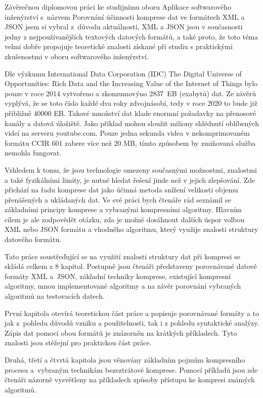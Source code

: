 Závěrečnou diplomovou práci ke studijnímu oboru Aplikace softwarového inženýrství s~ná\-zvem Porovnání účinnosti komprese dat ve formátech XML a JSON jsem si vybral z~důvodu aktuálnosti, XML a JSON jsou v současnosti jedny z nejpoužívanějších textových datových formátů, a také proto, že toto téma velmi dobře propojuje teoretické znalosti získané při studiu s praktickými zkušenostmi v oboru softwarového inženýrství.

Dle výzkumu International Data Corporation (IDC) The Digital Universe of Opportunities: Rich Data and the Increasing Value of the Internet of Things \cite{idc} bylo pouze v roce 2014 vytvořeno a zkonzumovýno 2837~EB (exabytů) dat. Ze závěrů vyplývá, že se toto číslo každé dva roky zdvojnásobí, tedy v roce 2020 to bude již přibližně 40000 EB. Takové množství dat klade enormní požadavky na přenosové kanály a datová úložiště. Jako příklad mohou sloužit miliony shlédnutí oblíbených videí na serveru youtube.com. Pouze jedna sekunda videa v nekomprimovaném formátu CCIR 601 zabere více než 20 MB, tímto způsobem by zmiňovaná služba nemohla fungovat.

Vzhledem k tomu, že jsou technologie omezeny současnými možnostmi, znalostmi a také fyzikálními limity, je nutné hledat řešení jinde než v jejich zlepšování. Zde přichází na řadu komprese dat jako účinná metoda snížení velikosti objemu přenášených a ukládaných dat. Ve své práci bych čtenáře rád seznámil se základními principy komprese a vybranými kompresními algoritmy. Hlavním cílem je ale zodpovědět otázku, zda je možné dosáhnout dalších úspor volbou XML nebo JSON formátu a vhodného algoritmu, který využije znalosti struktury datového formátu.

Tato práce soustřeďující se na využití znalosti struktury dat při kompresi se skládá celkem z 8 kapitol. Postupně jsou čtenáři představeny porovnávané datové formáty XML a~JSON, základní techniky komprese, existující kompresní algoritmy, mnou implementované algoritmy a na závěr porovnání vybraných algoritmů na testovacích datech.

První kapitola otevírá teoretickou část práce a popisuje porovnávané formáty a to jak z~pohledu důvodů vzniku a použitelnosti, tak i z pohledu syntaktické analýzy. Zápis dat pomocí obou formátů je znázorněn na krátkých příkladech. Tyto znalosti jsou stěžejní pro praktickou část práce.

Druhá, třetí a čtvrtá kapitola jsou věnovány základním pojmům kompresního procesu a~vybraným technikám bezeztrátové komprese. Pomocí příkladů jsou zde čtenáři názorně vysvětleny na příkladech způsoby přístupu ke kompresi známých algoritmů.

